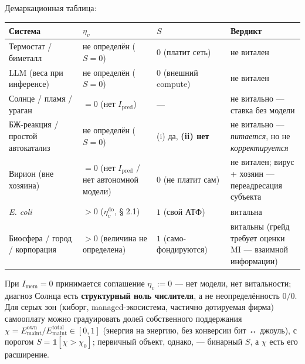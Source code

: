 \documentclass[pdflatex,sn-mathphys-ay]{sn-jnl}
\begin{document}
Демаркационная таблица:

\begin{center}\small
\begin{tabular}{@{} >{\raggedright\arraybackslash}p{0.2500\linewidth} >{\raggedright\arraybackslash}p{0.2500\linewidth} >{\raggedright\arraybackslash}p{0.2500\linewidth} >{\raggedright\arraybackslash}p{0.2500\linewidth}@{}}
\toprule
\begin{minipage}[b]{\linewidth}\raggedright
Система
\end{minipage} & \begin{minipage}[b]{\linewidth}\raggedright
\(\eta_v\)
\end{minipage} & \begin{minipage}[b]{\linewidth}\raggedright
\(S\)
\end{minipage} & \begin{minipage}[b]{\linewidth}\raggedright
Вердикт
\end{minipage} \\
\midrule
Термостат / биметалл & не определён (\(S=0\)) & \(0\) (платит сеть) & не витален \\
LLM (веса при инференсе) & не определён (\(S=0\)) & \(0\) (внешний compute) & не витален \\
Солнце / пламя / ураган & \(= 0\) (нет \(I_{\text{pred}}\)) & --- & не витально --- ставка без модели \\
БЖ-реакция / простой автокатализ & не определён (\(S=0\)) & (i) да, \textbf{(ii) нет} & не витально --- \emph{питается}, но не \emph{корректируется} \\
Вирион (вне хозяина) & \(= 0\) (нет \(I_{\text{pred}}\) / нет автономной модели) & \(0\) (не платит сам) & не витален; вирус + хозяин --- переадресация субъекта \\
\emph{E. coli} & \(> 0\) (\(\eta_v^{\mathrm{do}}\), § 2.1) & \(1\) (свой АТФ) & витальна \\
Биосфера / город / корпорация & \(> 0\) (величина не определена) & \(1\) (само-фондируются) & витальны (грейд требует оценки MI --- взаимной информации) \\
\bottomrule
\end{tabular}
\end{center}

При \(I_{\text{mem}} = 0\) принимается соглашение \(\eta_v := 0\) --- нет модели, нет витальности; диагноз Солнца есть \textbf{структурный ноль числителя}, а не неопределённость \(0/0\). Для серых зон (киборг, managed-экосистема, частично дотируемая фирма) самооплату можно градуировать долей собственного поддержания \(\chi = E_{\text{maint}}^{\text{own}}/E_{\text{maint}}^{\text{total}} \in [0, 1]\) (энергия на энергию, без конверсии бит ↔ джоуль), с порогом \(S = \mathbb{1}[\chi > \chi_0]\); первичный объект, однако, --- бинарный \(S\), а \(\chi\) есть его расширение.
\end{document}
